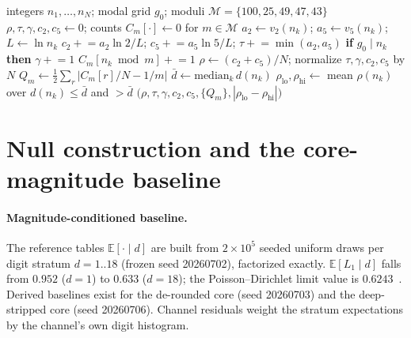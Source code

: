 \documentclass[12pt]{article}
\newcommand{\rmass}{\rho}
\newcommand{\gdepth}{\tau}
\begin{document}
\begin{algorithm}[t]
\caption{Recording-grid coordinates of a channel (eleven values)}
\label{alg:enc}
\begin{algorithmic}[1]
\Require integers $n_1,\dots,n_N$; modal grid $g_0$; moduli $\mathcal{M}=\{100,25,49,47,43\}$
\State $\rmass,\gdepth,\gamma,c_2,c_5 \gets 0$; counts $C_m[\cdot]\gets 0$ for $m\in\mathcal{M}$
  \State $a_2\gets v_2(n_k)$; $a_5\gets v_5(n_k)$; $L\gets\ln n_k$
  \State $c_2 \mathrel{+}= a_2\ln2/L$; $c_5 \mathrel{+}= a_5\ln5/L$; $\gdepth \mathrel{+}= \min(a_2,a_5)$
  \State \textbf{if} $g_0\mid n_k$ \textbf{then} $\gamma\mathrel{+}=1$
   $C_m[n_k \bmod m]\mathrel{+}=1$ \EndFor
\EndFor
\State $\rmass\gets(c_2+c_5)/N$; normalize $\gdepth,\gamma,c_2,c_5$ by $N$
 $Q_m\gets \tfrac12\sum_{r}|C_m[r]/N - 1/m|$ \EndFor
\State $\bar d\gets\mathrm{median}_k\, d(n_k)$
\State $\rmass_{\mathrm{lo}},\rmass_{\mathrm{hi}}\gets$ mean $\rmass(n_k)$ over $d(n_k)\le\bar d$ and $>\bar d$
\State \Return $\big(\rmass,\gdepth,\gamma,c_2,c_5,\{Q_m\},|\rmass_{\mathrm{lo}}-\rmass_{\mathrm{hi}}|\big)$
\end{algorithmic}
\end{algorithm}

\section{Null construction and the core-magnitude baseline}
\label{s:nulls}

\paragraph{Magnitude-conditioned baseline.}
The reference tables $\mathbb{E}[\cdot \mid d]$ are built from $2\times10^5$
seeded uniform draws per digit stratum $d = 1..18$ (frozen seed 20260702),
factorized exactly. $\mathbb{E}[L_1 \mid d]$ falls from $0.952$ ($d{=}1$) to
$0.633$ ($d{=}18$); the Poisson--Dirichlet limit value is
$0.6243$~\citep{dickman1930,billingsley1972,kingman1975,arratia2000}.
Derived baselines exist for the de-rounded core (seed 20260703) and the
deep-stripped core (seed 20260706). Channel residuals weight the stratum
expectations by the channel's own digit histogram.
\end{document}
